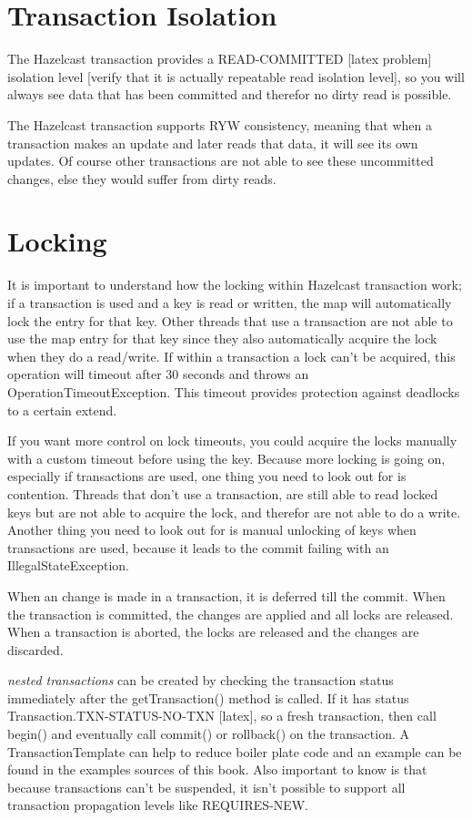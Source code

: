 \section{Transaction Isolation}
The Hazelcast transaction provides a READ-COMMITTED [latex problem] isolation level [verify that it is actually repeatable read isolation level], so you will always see data that has been committed and therefor no dirty read is possible. 

The Hazelcast transaction supports RYW consistency, meaning that when a transaction makes an update and later reads that data, it will see its own updates. Of course other transactions are not able to see these uncommitted changes, else they would suffer from dirty reads.

\section{Locking}
It is important to understand how the locking within Hazelcast transaction work; if a transaction is used and a key is read or written, the map will automatically lock the entry for that key. Other threads that use a transaction are not able to use the map entry for that key since they also automatically acquire the lock when they do a read/write. If within a transaction a lock can't be acquired, this operation will timeout after 30 seconds and throws an OperationTimeoutException. This timeout provides protection against deadlocks to a certain extend.

If you want more control on lock timeouts, you could acquire the locks manually with a custom timeout before using the key. Because more locking is going on, especially if transactions are used, one thing you need to look out for is contention. Threads that don't use a transaction, are still able to read locked keys but are not able to acquire the lock, and therefor are not able to do a write. Another thing you need to look out for is manual unlocking of keys when transactions are used, because it leads to the commit failing with an IllegalStateException. 

When an change is made in a transaction, it is deferred till the commit. When the transaction is committed, the changes are applied and all locks are released. When a transaction is aborted, the locks are released and the changes are discarded.

\emph{nested transactions} can be created by checking the transaction status immediately after the getTransaction() method is called. If it has status Transaction.TXN-STATUS-NO-TXN [latex], so a fresh transaction, then call begin() and eventually call commit() or rollback() on the transaction. A TransactionTemplate can help to reduce boiler plate code and an example can be found in the examples sources of this book. Also important to know is that because transactions can't be suspended, it isn't possible to support all transaction propagation levels like REQUIRES-NEW. 

